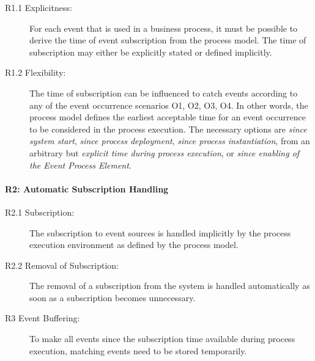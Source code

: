 \begin{description}
	\item[R1.1 Explicitness:] 
	For each event that is used in a business process, it must be possible to derive the time of event subscription from the process model. The time of subscription may either be explicitly stated or defined implicitly.
	\item[R1.2 Flexibility:] 
	The time of subscription can be influenced to catch events according to any of the event occurrence scenarios O1, O2, O3, O4. In other words, the process model defines the earliest acceptable time for an event occurrence to be considered in the process execution. The necessary options are \textit{since system start}, \textit{since process deployment}, \textit{since process instantiation}, from an arbitrary but \textit{explicit time during process execution}, or \textit{since enabling of the Event Process Element}.
\end{description}



\paragraph{R2: Automatic Subscription Handling}

\begin{description}
	\item[R2.1 Subscription:] 
	The subscription to event sources is handled implicitly by the process execution environment as defined by the process model.
	\item[R2.2 Removal of Subscription:] 
	The removal of a subscription from the system is handled automatically as soon as a subscription becomes unnecessary.
\end{description}


\begin{description}
	\item[R3 Event Buffering:]
	To make all events since the subscription time available during process execution, matching events need to be stored temporarily.
\end{description}

